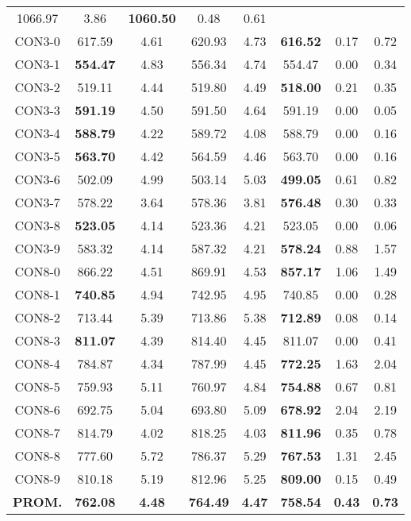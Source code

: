 \begin{table}[h]
\begin{tabular}{c c c c c c c c}
1066.97 & 3.86 & \bf{1060.50} & 
0.48 & 0.61\\CON3-0 & 617.59 & 4.61 & 
620.93 & 4.73 & \bf{616.52} & 
0.17 & 0.72\\CON3-1 & \bf{554.47} & 4.83 & 
556.34 & 4.74 & 554.47 & 0.00
 & 0.34\\CON3-2 & 519.11 & 4.44 & 
519.80 & 4.49 & \bf{518.00} & 
0.21 & 0.35\\CON3-3 & \bf{591.19} & 4.50 & 
591.50 & 4.64 & 591.19 & 0.00
 & 0.05\\CON3-4 & \bf{588.79} & 4.22 & 
589.72 & 4.08 & 588.79 & 0.00
 & 0.16\\CON3-5 & \bf{563.70} & 4.42 & 
564.59 & 4.46 & 563.70 & 0.00
 & 0.16\\CON3-6 & 502.09 & 4.99 & 
503.14 & 5.03 & \bf{499.05} & 
0.61 & 0.82\\CON3-7 & 578.22 & 3.64 & 
578.36 & 3.81 & \bf{576.48} & 
0.30 & 0.33\\CON3-8 & \bf{523.05} & 4.14 & 
523.36 & 4.21 & 523.05 & 0.00
 & 0.06\\CON3-9 & 583.32 & 4.14 & 
587.32 & 4.21 & \bf{578.24} & 
0.88 & 1.57\\CON8-0 & 866.22 & 4.51 & 
869.91 & 4.53 & \bf{857.17} & 
1.06 & 1.49\\CON8-1 & \bf{740.85} & 4.94 & 
742.95 & 4.95 & 740.85 & 0.00
 & 0.28\\CON8-2 & 713.44 & 5.39 & 
713.86 & 5.38 & \bf{712.89} & 
0.08 & 0.14\\CON8-3 & \bf{811.07} & 4.39 & 
814.40 & 4.45 & 811.07 & 0.00
 & 0.41\\CON8-4 & 784.87 & 4.34 & 
787.99 & 4.45 & \bf{772.25} & 
1.63 & 2.04\\CON8-5 & 759.93 & 5.11 & 
760.97 & 4.84 & \bf{754.88} & 
0.67 & 0.81\\CON8-6 & 692.75 & 5.04 & 
693.80 & 5.09 & \bf{678.92} & 
2.04 & 2.19\\CON8-7 & 814.79 & 4.02 & 
818.25 & 4.03 & \bf{811.96} & 
0.35 & 0.78\\CON8-8 & 777.60 & 5.72 & 
786.37 & 5.29 & \bf{767.53} & 
1.31 & 2.45\\CON8-9 & 810.18 & 5.19 & 
812.96 & 5.25 & \bf{809.00} & 
0.15 & 0.49\\\bf{PROM.} & 
\bf{762.08} & \bf{4.48} & \bf{764.49} & \bf{4.47} & \bf{758.54} & \bf{0.43} & \bf{0.73}\\[1ex]\hline
\end{tabular}
\label{table:nonlin}
\end{table}
